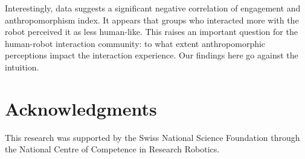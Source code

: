\documentclass{sig-alternate}
\begin{document}
Interestingly, data suggests a significant negative correlation of engagement
and anthropomorphism index. It appears that groups who interacted more with the
robot perceived it as less human-like. This raises an important question for the
human-robot interaction community: to what extent anthropomorphic perceptions
impact the interaction experience. Our findings here go against the intuition.


\section*{Acknowledgments}

This research was supported by the Swiss National Science Foundation through the
National Centre of Competence in Research Robotics.




\balancecolumns
\end{document}
